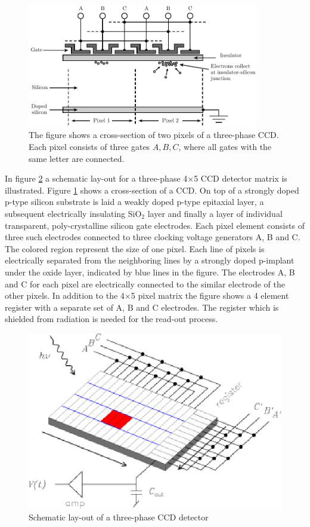\begin{figure}[htpb]
	\centering
	\includegraphics[width=0.9\textwidth]{ccd-gate-structure2.pdf}
	\caption{The figure shows a cross-section of two pixels of a three-phase CCD. Each pixel
	consists of three gates $A,B,C$, where all gates with the same letter are connected.}
	\label{fig:ccd-gate-structure}
\end{figure}

%
In figure \ref{CCD.figschematic} a schematic lay-out for a three-phase
4$\times $5 CCD detector matrix is illustrated. Figure \ref{fig:ccd-gate-structure} shows
a cross-section of a CCD. On top of a strongly
doped p-type silicon substrate is laid a weakly doped p-type epitaxial
layer, a subsequent electrically insulating SiO$_2$ layer and finally
a layer of individual transparent, poly-crystalline silicon gate
electrodes.  Each pixel element consists of three such electrodes
connected to three clocking voltage generators A, B and C. The colored
region represent the size of one pixel. Each line of pixels is
electrically separated from the neighboring lines by a strongly doped
p-implant under the oxide layer, indicated by blue lines in the
figure. The electrodes A, B and C for each pixel are electrically
connected to the similar electrode of the other pixels. In addition to
the 4$\times$5 pixel matrix the figure shows a 4 element register with
a separate set of A, B and C electrodes. The register which is
shielded from radiation is needed for the read-out process.

\begin{figure}[h]
  \centering
	\includegraphics{CCD_schematic.eps}
  \caption{Schematic lay-out of a three-phase CCD detector}
  \label{CCD.figschematic}
\end{figure}

